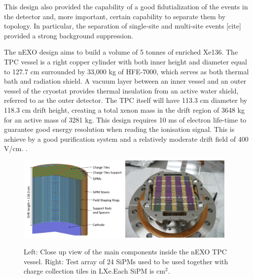This design also provided the capability of a good fidutialization of the events in the detector and, more important, certain capability to separate them by topology. In particular, the separation of single-site and multi-site events [cite] provided a strong background suppression.

The nEXO design aims to build a volume of 5 tonnes of enriched Xe136. The TPC vessel is a right copper cylinder with both inner height and diameter equal to 127.7 cm surrounded by 33,000 kg of HFE-7000, which serves as both thermal bath and radiation shield. A vacuum layer between an inner vessel and an outer vessel of the cryostat provides thermal insulation from an active water shield, referred to as the outer detector. The TPC itself will have 113.3 cm diameter by 118.3 cm drift height, creating a total xenon mass in the drift region of 3648 kg for an active mass of 3281 kg. This design requires 10 ms of electron life-time to guarantee good energy resolution when reading the ionisation signal. This is achieve by a good purification system and a relatively moderate drift field of 400 V/cm. \cite{nEXO:2021ujk}.



\begin{figure}[t!]
\begin{center}
\includegraphics[width=0.475\textwidth]{img/nexo_design}
\includegraphics[width=0.475\textwidth]{img/nexo_sipms}
\end{center}
\caption{Left: Close up view of the main components inside the nEXO TPC vessel. Right: Test array of 24 SiPMs used to be used together with charge collection tiles in LXe.Each SiPM is cm$^2$.} \label{fig:nexo}
\end{figure}

